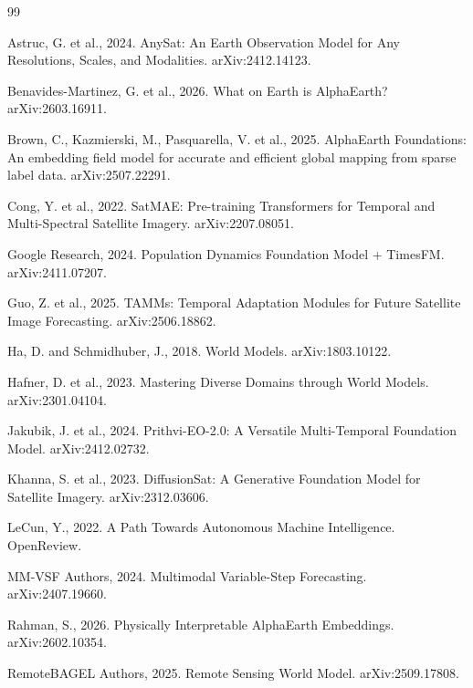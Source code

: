 \documentclass{article}
\begin{document}
\begin{thebibliography}{99}

Astruc, G. et al., 2024. AnySat: An Earth Observation Model for Any Resolutions, Scales, and Modalities. arXiv:2412.14123.

Benavides-Martinez, G. et al., 2026. What on Earth is AlphaEarth? arXiv:2603.16911.

Brown, C., Kazmierski, M., Pasquarella, V. et al., 2025. AlphaEarth Foundations: An embedding field model for accurate and efficient global mapping from sparse label data. arXiv:2507.22291.

Cong, Y. et al., 2022. SatMAE: Pre-training Transformers for Temporal and Multi-Spectral Satellite Imagery. arXiv:2207.08051.

Google Research, 2024. Population Dynamics Foundation Model + TimesFM. arXiv:2411.07207.

Guo, Z. et al., 2025. TAMMs: Temporal Adaptation Modules for Future Satellite Image Forecasting. arXiv:2506.18862.

Ha, D. and Schmidhuber, J., 2018. World Models. arXiv:1803.10122.

Hafner, D. et al., 2023. Mastering Diverse Domains through World Models. arXiv:2301.04104.

Jakubik, J. et al., 2024. Prithvi-EO-2.0: A Versatile Multi-Temporal Foundation Model. arXiv:2412.02732.

Khanna, S. et al., 2023. DiffusionSat: A Generative Foundation Model for Satellite Imagery. arXiv:2312.03606.

LeCun, Y., 2022. A Path Towards Autonomous Machine Intelligence. OpenReview.

MM-VSF Authors, 2024. Multimodal Variable-Step Forecasting. arXiv:2407.19660.

Rahman, S., 2026. Physically Interpretable AlphaEarth Embeddings. arXiv:2602.10354.

RemoteBAGEL Authors, 2025. Remote Sensing World Model. arXiv:2509.17808.


\end{thebibliography}
\end{document}
